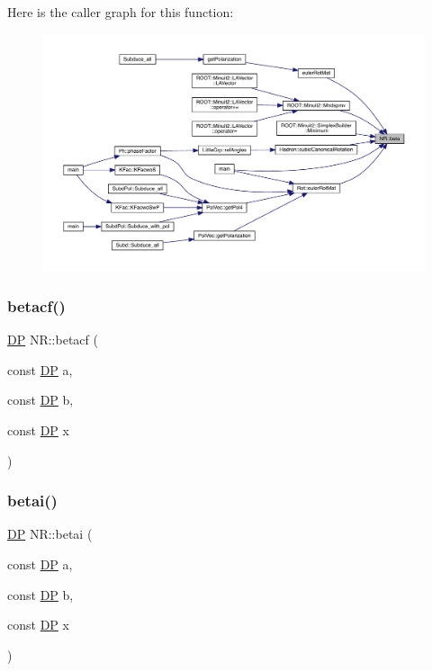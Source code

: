 Here is the caller graph for this function\+:
\nopagebreak
\begin{figure}[H]
\begin{center}
\leavevmode
\includegraphics[width=350pt]{da/d46/namespaceNR_a060c1496967431dfd707b603985a33b7_icgraph}
\end{center}
\end{figure}
\mbox{\label{namespaceNR_a52e6dba4373484f23464637a58c46c39}} 
\subsubsection{\texorpdfstring{betacf()}{betacf()}}
{\footnotesize\ttfamily \mbox{\hyperlink{namespaceNR_af6ff762dd605ff477b8e52387253a02a}{DP}} N\+R\+::betacf (\begin{DoxyParamCaption}\item[{const \mbox{\hyperlink{namespaceNR_af6ff762dd605ff477b8e52387253a02a}{DP}}}]{a,  }\item[{const \mbox{\hyperlink{namespaceNR_af6ff762dd605ff477b8e52387253a02a}{DP}}}]{b,  }\item[{const \mbox{\hyperlink{namespaceNR_af6ff762dd605ff477b8e52387253a02a}{DP}}}]{x }\end{DoxyParamCaption})}

\mbox{\label{namespaceNR_a462b09f1ae76391cfc50c8a032259b8a}} 
\subsubsection{\texorpdfstring{betai()}{betai()}}
{\footnotesize\ttfamily \mbox{\hyperlink{namespaceNR_af6ff762dd605ff477b8e52387253a02a}{DP}} N\+R\+::betai (\begin{DoxyParamCaption}\item[{const \mbox{\hyperlink{namespaceNR_af6ff762dd605ff477b8e52387253a02a}{DP}}}]{a,  }\item[{const \mbox{\hyperlink{namespaceNR_af6ff762dd605ff477b8e52387253a02a}{DP}}}]{b,  }\item[{const \mbox{\hyperlink{namespaceNR_af6ff762dd605ff477b8e52387253a02a}{DP}}}]{x }\end{DoxyParamCaption})}

